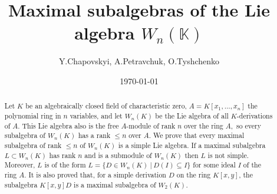 \documentclass[12pt,a4paper]{amsart}
\theoremstyle{plain}
\theoremstyle{definition}
\begin{document}
\sloppy
%
\title[Maximal subalgebras of the Lie algebra $W_n(\mathbb{K})$]
{Maximal subalgebras of the Lie algebra $W_n(\mathbb{K})$}
\author
{Y.Chapovskyi, A.Petravchuk, O.Tyshchenko}
\address{Institute of Mathematics, National Academy of Sciences of Ukraine,
Tereschenkivska street, 3, 01004 Kyiv, Ukraine}
\address{ Faculty of Mechanics and Mathematics,
Taras Shevchenko National University of Kyiv, 64, Volodymyrska street, 01033  Kyiv, Ukraine}
\address{ Faculty of Mechanics and Mathematics,
	Taras Shevchenko National University of Kyiv, 64, Volodymyrska street, 01033  Kyiv, Ukraine}

\date{\today}


\begin{abstract}
Let $K$ be an algebraically closed field of characteristic zero, $A= K[x_1, \dots, x_n]$ the polynomial ring in $n$ variables, and let $W_n(K)$ be the Lie algebra of all $K$-derivations of $A.$  This Lie algebra also  is  the free $A$-module of rank $n$ over the ring $A,$ so every subalgebra of $W_n(K)$ has a rank $\leq n$ over $A.$ We prove that every maximal subalgebra of rank $\leq n$ of $W_n(K)$ is a simple Lie algebra. If a maximal subalgebra $L\subset W_n(K)$ has rank $n$ and is a submodule of $W_n(K)$ then $L$ is not simple. Moreover, $L$ is of the form $L=\{ D\in W_n(K) \  |  \ D(I)\subseteq I\} $ for some ideal $I$ of the ring $A.$ It is also proved that, for a simple derivation $D$ on the ring $K[x, y]$, the subalgebra $K[x, y]D$ is a maximal subalgebra   of $W_2(K).$ 
 \end{abstract}
\maketitle

\end{document}
